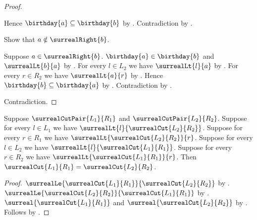\begin{proof}
\begin{subproof}
        Hence $\birthday{a}\subseteq\birthday{b}$
            by .
        Contradiction by .
    \end{subproof}
    Show that $a\notin\surrealRight{b}$.
    \begin{subproof}
        Suppose $a\in\surrealRight{b}$.
        $\birthday{a}\in\birthday{b}$ and $\surrealLt{b}{a}$
            by .
        For every $l\in L_2$ we have $\surrealLt{l}{a}$
            by .
        For every $r\in R_2$ we have $\surrealLt{a}{r}$
            by \auto.
        Hence $\birthday{b}\subseteq\birthday{a}$
            by .
        Contradiction by .
    \end{subproof}
    Contradiction.
\end{proof}

\begin{theorem}\label{surreal_cut_extensionality}
    Suppose $\surrealCutPair{L_1}{R_1}$ and
        $\surrealCutPair{L_2}{R_2}$.
    Suppose for every $l\in L_1$ we have
        $\surrealLt{l}{\surrealCut{L_2}{R_2}}$.
    Suppose for every $r\in R_1$ we have
        $\surrealLt{\surrealCut{L_2}{R_2}}{r}$.
    Suppose for every $l\in L_2$ we have
        $\surrealLt{l}{\surrealCut{L_1}{R_1}}$.
    Suppose for every $r\in R_2$ we have
        $\surrealLt{\surrealCut{L_1}{R_1}}{r}$.
    Then $\surrealCut{L_1}{R_1}=\surrealCut{L_2}{R_2}$.
\end{theorem}
\begin{proof}
    $\surrealLe{\surrealCut{L_1}{R_1}}{\surrealCut{L_2}{R_2}}$
        by .
    $\surrealLe{\surrealCut{L_2}{R_2}}{\surrealCut{L_1}{R_1}}$
        by .
    $\surreal{\surrealCut{L_1}{R_1}}$ and
        $\surreal{\surrealCut{L_2}{R_2}}$
        by .
    Follows by .
\end{proof}
